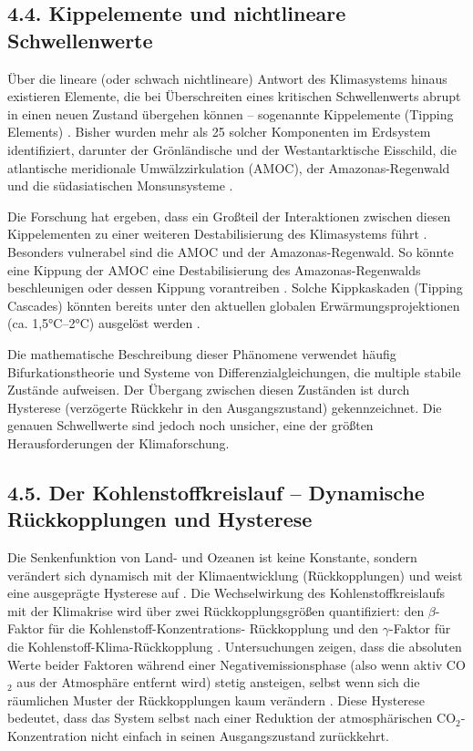 \documentclass[12pt, a4paper]{article}
\begin{document}
	\subsection*{4.4. Kippelemente und nichtlineare Schwellenwerte}
	Über die lineare (oder schwach nichtlineare) Antwort des Klimasystems hinaus existieren
	Elemente, die bei Überschreiten eines kritischen Schwellenwerts abrupt in einen neuen Zustand
	übergehen können – sogenannte Kippelemente (Tipping Elements) \cite{carbonbrief2025}. Bisher
	wurden mehr als 25 solcher Komponenten im Erdsystem identifiziert, darunter der Grönländische
	und der Westantarktische Eisschild, die atlantische meridionale Umwälzzirkulation (AMOC),
	der Amazonas-Regenwald und die südasiatischen Monsunsysteme \cite{carbonbrief2025, wunderling2022}.
	
	Die Forschung hat ergeben, dass ein Großteil der Interaktionen zwischen diesen Kippelementen
	zu einer weiteren Destabilisierung des Klimasystems führt \cite{carbonbrief2025}. Besonders
	vulnerabel sind die AMOC und der Amazonas-Regenwald. So könnte eine Kippung der AMOC eine
	Destabilisierung des Amazonas-Regenwalds beschleunigen oder dessen Kippung vorantreiben
	\cite{carbonbrief2025}. Solche Kippkaskaden (Tipping Cascades) könnten bereits unter den
	aktuellen globalen Erwärmungsprojektionen (ca. 1,5°C–2°C) ausgelöst werden \cite{carbonbrief2025, wunderling2022}.
	
	Die mathematische Beschreibung dieser Phänomene verwendet häufig Bifurkationstheorie und
	Systeme von Differenzialgleichungen, die multiple stabile Zustände aufweisen. Der Übergang
	zwischen diesen Zuständen ist durch Hysterese (verzögerte Rückkehr in den Ausgangszustand)
	gekennzeichnet. Die genauen Schwellwerte sind jedoch noch unsicher, eine der größten
	Herausforderungen der Klimaforschung.
	
	\subsection*{4.5. Der Kohlenstoffkreislauf – Dynamische Rückkopplungen und Hysterese}
	Die Senkenfunktion von Land- und Ozeanen ist keine Konstante, sondern verändert sich dynamisch
	mit der Klimaentwicklung (Rückkopplungen) und weist eine ausgeprägte Hysterese auf
	\cite{asaadi2024}. Die Wechselwirkung des Kohlenstoffkreislaufs mit der Klimakrise wird über
	zwei Rückkopplungsgrößen quantifiziert: den $\beta$-Faktor für die Kohlenstoff-Konzentrations-
	Rückkopplung und den $\gamma$-Faktor für die Kohlenstoff-Klima-Rückkopplung \cite{asaadi2024}.
	Untersuchungen zeigen, dass die absoluten Werte beider Faktoren während einer
	Negativemissionsphase (also wenn aktiv CO$_2$ aus der Atmosphäre entfernt wird) stetig
	ansteigen, selbst wenn sich die räumlichen Muster der Rückkopplungen kaum verändern
	\cite{asaadi2024}. Diese Hysterese bedeutet, dass das System selbst nach einer Reduktion
	der atmosphärischen CO$_2$-Konzentration nicht einfach in seinen Ausgangszustand zurückkehrt.
	
\end{document}
